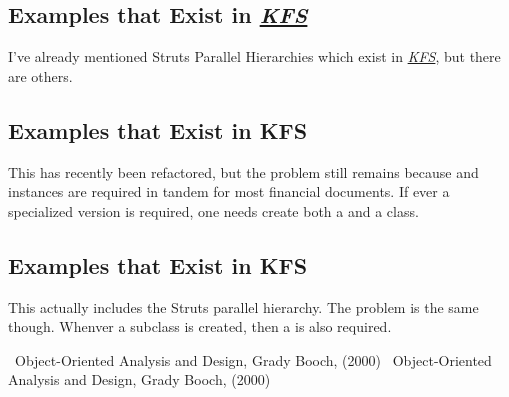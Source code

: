 \documentclass[12pt,notitlepage]{article}
\newcommand{\KFS}{\emph{\href{http://www.kuali.org}{KFS}}}
\begin{document}
\begin{s5presentation}
      \subsection{Examples that Exist in \KFS}
      I've already mentioned Struts Parallel Hierarchies which exist in \KFS, but there are others. 

      \begin{description}
        \W \begin{s5slide}
        \W \section{Examples that Exist in KFS}
        \item[\sf{SourceAccountingLine}\rm{} and \sf{TargetAccountingLine}\rm{}]
          This has recently been refactored, but the problem still remains because 
          \rm{} and \rm{} instances are required in tandem for most financial documents. 
          If ever a specialized version is required, one needs create both a \rm{} and a \rm{}
          class.
          \W \end{s5slide}
        
        \W \begin{s5slide}
          \W \section{Examples that Exist in KFS}
      \item[\sf{AccountingDocument}\rm{} and \sf{AccountingDocumentRule}\rm{}]
          This actually includes the Struts parallel hierarchy. The problem is the same though. Whenver a \rm{} subclass 
          is created, then a \rm{} is also required.
          \W \end{s5slide}
      \end{description}
      
  \W \end{s5presentation}
  \begin{tex}
    \begin{thebibliography}{20}
     ~Object-Oriented Analysis and Design, Grady Booch, (2000) 
     ~Object-Oriented Analysis and Design, Grady Booch, (2000) 
    \end{thebibliography}
  \end{tex}
\end{document}
